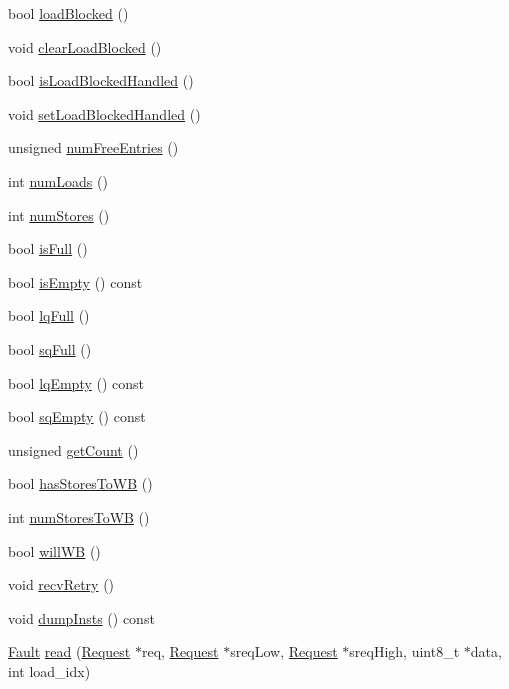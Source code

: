 \begin{DoxyCompactItemize}
bool \hyperlink{classLSQUnit_a05c413ba417c6453e99f75d87c958590}{loadBlocked} ()
\item 
void \hyperlink{classLSQUnit_aaa9628e569d007b553e6830774b8548c}{clearLoadBlocked} ()
\item 
bool \hyperlink{classLSQUnit_ad0aa91a7b51ca925abf9c9992abad314}{isLoadBlockedHandled} ()
\item 
void \hyperlink{classLSQUnit_ac8bfb1e163f7ba2261d702623226973d}{setLoadBlockedHandled} ()
\item 
unsigned \hyperlink{classLSQUnit_a028971a565aca048c67ea1c36a6a9d51}{numFreeEntries} ()
\item 
int \hyperlink{classLSQUnit_a54460b759fb06e2b18e26657279a6f49}{numLoads} ()
\item 
int \hyperlink{classLSQUnit_aa0fc32a4a9d77696f5907f4d25e7d07f}{numStores} ()
\item 
bool \hyperlink{classLSQUnit_a3e70330939fdfc4dbc2f60c1a660584d}{isFull} ()
\item 
bool \hyperlink{classLSQUnit_a479432127ee77145cc19d6a2d1590821}{isEmpty} () const 
\item 
bool \hyperlink{classLSQUnit_a5893daf623130be826f492bbff58f757}{lqFull} ()
\item 
bool \hyperlink{classLSQUnit_a477981d1f905d2d398a1527f7149e3c4}{sqFull} ()
\item 
bool \hyperlink{classLSQUnit_a01d2807c1345befcffd168a2a9dbdbf2}{lqEmpty} () const 
\item 
bool \hyperlink{classLSQUnit_a5761e9640bec8ba8474945cce57b6501}{sqEmpty} () const 
\item 
unsigned \hyperlink{classLSQUnit_a24ba9cb3fa1e726321780a20a960c8cd}{getCount} ()
\item 
bool \hyperlink{classLSQUnit_ad2e4b46255cfb53e85522adeed4e2089}{hasStoresToWB} ()
\item 
int \hyperlink{classLSQUnit_a276cdbdaf4551f1b846c4e2535c5f882}{numStoresToWB} ()
\item 
bool \hyperlink{classLSQUnit_a338be821734603396bfef8d9fb8f04b0}{willWB} ()
\item 
void \hyperlink{classLSQUnit_a29cb5a4f98063ce6e9210eacbdb35298}{recvRetry} ()
\item 
void \hyperlink{classLSQUnit_ad0dcc54f6823ec37a9ab4eef289e2305}{dumpInsts} () const 
\item 
\hyperlink{classRefCountingPtr}{Fault} \hyperlink{classLSQUnit_a6f61d3e96e7ebc628121a63027d9c106}{read} (\hyperlink{classRequest}{Request} $\ast$req, \hyperlink{classRequest}{Request} $\ast$sreqLow, \hyperlink{classRequest}{Request} $\ast$sreqHigh, uint8\_\-t $\ast$data, int load\_\-idx)

\end{DoxyCompactItemize}
